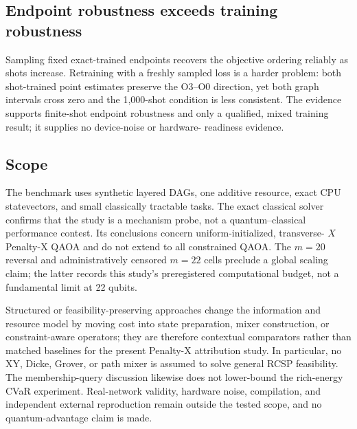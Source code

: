 \subsection*{Endpoint robustness exceeds training robustness}

Sampling fixed exact-trained endpoints recovers the objective ordering
reliably as shots increase. Retraining with a freshly sampled loss is a harder
problem: both shot-trained point estimates preserve the O3--O0 direction, yet
both graph intervals cross zero and the 1,000-shot condition is less
consistent. The evidence supports finite-shot endpoint robustness and only a
qualified, mixed training result; it supplies no device-noise or hardware-
readiness evidence.

\subsection*{Scope}

The benchmark uses synthetic layered DAGs, one additive resource, exact CPU
statevectors, and small classically tractable tasks. The exact classical
solver confirms that the study is a mechanism probe, not a quantum--classical
performance contest. Its conclusions concern uniform-initialized, transverse-
$X$ Penalty-X QAOA and do not extend to all constrained QAOA. The $m=20$
reversal and administratively censored $m=22$ cells preclude a global scaling
claim; the latter records this study's preregistered computational budget, not
a fundamental limit at 22 qubits.

Structured or feasibility-preserving approaches change the information and
resource model by moving cost into state preparation, mixer construction, or
constraint-aware operators; they are therefore contextual comparators rather
than matched baselines for the present Penalty-X attribution study. In
particular, no XY, Dicke, Grover, or path mixer is assumed to solve general
RCSP feasibility. The membership-query discussion likewise does not
lower-bound the rich-energy CVaR experiment. Real-network validity, hardware
noise, compilation, and independent external reproduction remain outside the
tested scope, and no quantum-advantage claim is made.

